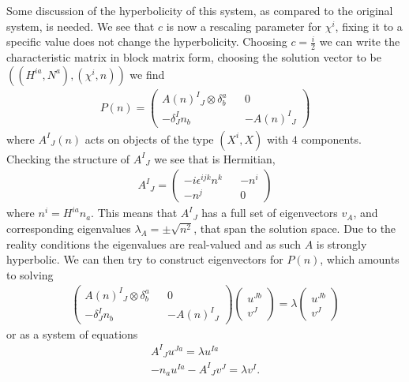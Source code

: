 \documentclass[10pt]{report}
\theoremstyle{definition}
\begin{document}
    Some discussion of the hyperbolicity of this system, as compared to the original system, is needed. We see that $c$ is now a rescaling parameter for $\chi^i$, fixing it to a specific value does not change the hyperbolicity. Choosing $c = \frac{i}{2}$ we can write the characteristic matrix in block matrix form, choosing the solution vector to be $((H^{ia},N^a),(\chi^i,n))$ we find
    \begin{align}
        P(n) = \begin{pmatrix}
            A(n)^I{}_J \otimes \delta^a_b && 0 \\ -\delta^I_J n_b && -A(n)^I{}_J
        \end{pmatrix}
    \end{align}
    where $A^I{}_J(n)$ acts on objects of the type $(X^i,X)$ with $4$ components. Checking the structure of $A^I{}_J$ we see that is Hermitian,
    \begin{align}
        A^I{}_J = \begin{pmatrix}
            -i\epsilon^{ijk} n^k && - n^i \\ -n^j && 0
        \end{pmatrix}
    \end{align}
    where $n^i = H^{ia} n_a$. This means that $A^I{}_J$ has a full set of eigenvectors $v_A$, and corresponding eigenvalues $\lambda_A = \pm \sqrt{n^2}$, that span the solution space. Due to the reality conditions the eigenvalues are real-valued and as such $A$ is strongly hyperbolic. We can then try to construct eigenvectors for $P(n)$, which amounts to solving 
    \begin{align}
        \begin{pmatrix}
            A(n)^I{}_J \otimes \delta^a_b && 0 \\ -\delta^I_J n_b && -A(n)^I{}_J
        \end{pmatrix} \begin{pmatrix}
            u^{Jb} \\ v^J
        \end{pmatrix} = \lambda \begin{pmatrix}
            u^{Jb} \\ v^J
        \end{pmatrix}
    \end{align}
    or as a system of equations 
    \begin{align}
        A^I{}_J u^{Ja} = \lambda u^{Ia} \\
        -n_a u^{Ia} - A^I{}_J v^J = \lambda v^I.
    \end{align}
\end{document}
